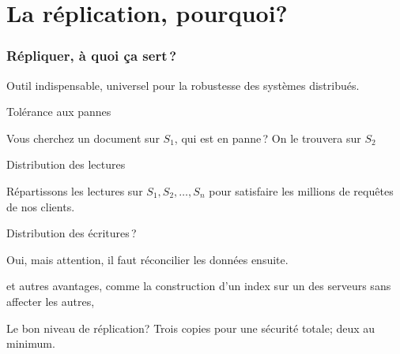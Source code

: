 
\section{La réplication, pourquoi?}

\begin{frame}
\frametitle{Répliquer, à quoi ça sert\,?}

Outil indispensable, universel pour la robustesse des systèmes distribués.

\begin{redbullet}
  \item \alert{Tolérance aux pannes}
  
     Vous cherchez un document sur $S_1$, qui est en panne\,? On le trouvera sur $S_2$
     
 \item \alert{Distribution des lectures}
 
    Répartissons les lectures sur $S_1, S_2, \ldots, S_n$ pour satisfaire les millions de requêtes de nos clients.
    
 \item \alert{Distribution des écritures\,?}
 
    Oui, mais attention, il faut \alert{réconcilier} les données ensuite.
    
     \item et autres avantages, comme la construction d'un index sur un des serveurs sans affecter les autres, 
     
 \end{redbullet}

Le bon niveau de réplication? \alert{Trois copies pour une sécurité totale; deux au minimum}.

\end{frame}


